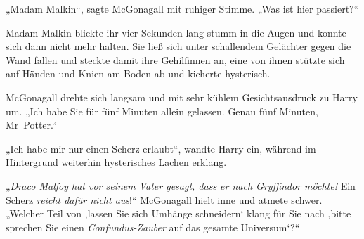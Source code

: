 „Madam Malkin“, sagte McGonagall mit ruhiger Stimme. „Was ist hier passiert?“

Madam Malkin blickte ihr vier Sekunden lang stumm in die Augen und konnte sich dann nicht mehr halten. Sie ließ sich unter schallendem Gelächter gegen die Wand fallen und steckte damit ihre Gehilfinnen an, eine von ihnen stützte sich auf Händen und Knien am Boden ab und kicherte hysterisch.

McGonagall drehte sich langsam und mit sehr kühlem Gesichtsausdruck zu Harry um. „Ich habe Sie für fünf Minuten allein gelassen. Genau fünf Minuten, Mr~Potter.“

„Ich habe mir nur einen Scherz erlaubt“, wandte Harry ein, während im Hintergrund weiterhin hysterisches Lachen erklang.

„\emph{Draco Malfoy hat vor seinem Vater gesagt, dass er nach Gryffindor möchte!} Ein Scherz \emph{reicht dafür nicht aus}!“ McGonagall hielt inne und atmete schwer. „Welcher Teil von ‚lassen Sie sich Umhänge schneidern‘ klang für Sie nach ‚bitte sprechen Sie einen \emph{Confundus-Zauber} auf das gesamte Universum‘?“

